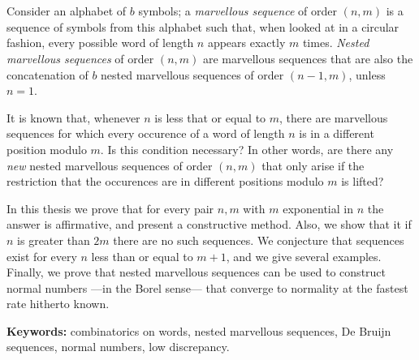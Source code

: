 \chapter*{\runtitle}

Consider an alphabet of $b$ symbols; a \emph{marvellous sequence} of
order $(n,m)$ is a sequence of symbols from this alphabet such that,
when looked at in a circular fashion, every possible word of length $n$ appears
exactly $m$ times.
\emph{Nested marvellous sequences} of order $(n,m)$ are marvellous
sequences that are also the concatenation of $b$ nested
marvellous sequences of order $(n-1,m)$, unless $n = 1$.

It is known that, whenever $n$ is less that or equal to $m$, there are marvellous
sequences for which every occurence of a word of length $n$ is in a different
position modulo $m$. Is this condition necessary? In other words,
are there any \emph{new} nested marvellous sequences of order $(n,m)$ that only
arise if the restriction that the occurences are in different positions modulo
$m$ is lifted?

In this thesis we prove that for every pair $n,m$ with $m$ exponential in $n$
the answer is affirmative, and present a constructive method.
Also, we show that it if $n$ is greater than $2m$ there are no such sequences.
We conjecture that sequences exist for every $n$ less than or equal to $m + 1$,
and we give several examples.
Finally, we prove that nested marvellous sequences can be used to construct
normal numbers ---in the Borel sense--- that converge to normality at the
fastest rate hitherto known.

\bigskip

\noindent\textbf{Keywords:}
combinatorics on words,
nested marvellous sequences,
De Bruijn sequences,
normal numbers,
low discrepancy.
